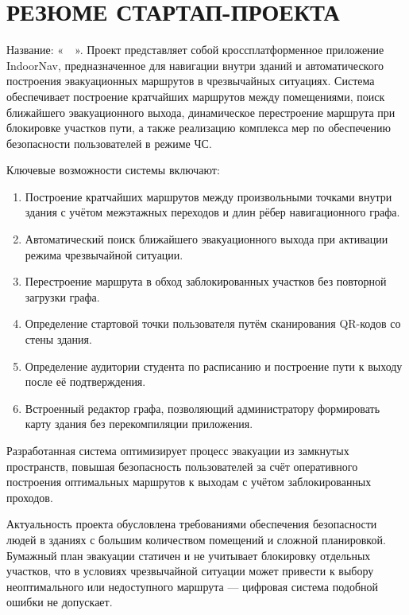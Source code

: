 \newpage
\section*{РЕЗЮМЕ СТАРТАП-ПРОЕКТА}

Название: «\ \ ». Проект представляет собой кроссплатформенное приложение IndoorNav, предназначенное для навигации внутри зданий и автоматического построения эвакуационных маршрутов в чрезвычайных ситуациях. Система обеспечивает построение кратчайших маршрутов между помещениями, поиск ближайшего эвакуационного выхода, динамическое перестроение маршрута при блокировке участков пути, а также реализацию комплекса мер по обеспечению безопасности пользователей в режиме ЧС.

Ключевые возможности системы включают:
\begin{enumerate}
\item Построение кратчайших маршрутов между произвольными точками внутри здания с учётом межэтажных переходов и длин рёбер навигационного графа.

\item Автоматический поиск ближайшего эвакуационного выхода при активации режима чрезвычайной ситуации.

\item Перестроение маршрута в обход заблокированных участков без повторной загрузки графа.

\item Определение стартовой точки пользователя путём сканирования QR-кодов со стены здания.

\item Определение аудитории студента по расписанию и построение пути к выходу после её подтверждения.

\item Встроенный редактор графа, позволяющий администратору формировать карту здания без перекомпиляции приложения.
\end{enumerate}

Разработанная система оптимизирует процесс эвакуации из замкнутых пространств, повышая безопасность пользователей за счёт оперативного построения оптимальных маршрутов к выходам с учётом заблокированных проходов.

Актуальность проекта обусловлена требованиями обеспечения безопасности людей в зданиях с большим количеством помещений и сложной планировкой. Бумажный план эвакуации статичен и не учитывает блокировку отдельных участков, что в условиях чрезвычайной ситуации может привести к выбору неоптимального или недоступного маршрута — цифровая система подобной ошибки не допускает.

